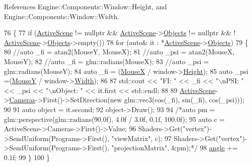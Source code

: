 References Engine\+::\+Components\+::\+Window\+::\+Height, and Engine\+::\+Components\+::\+Window\+::\+Width.


\begin{DoxyCode}
76 \{
77     \textcolor{keywordflow}{if} (\mbox{\hyperlink{classEngine_1_1BaseEngine_adb3dbc839da9d821e08b18d8a221698d}{ActiveScene}} != \textcolor{keyword}{nullptr} && \mbox{\hyperlink{classEngine_1_1BaseEngine_adb3dbc839da9d821e08b18d8a221698d}{ActiveScene}}->\mbox{\hyperlink{classEngine_1_1Components_1_1Scene_a23481feabaaa56bf5613765db03af4da}{Objects}} != \textcolor{keyword}{nullptr} && !
      \mbox{\hyperlink{classEngine_1_1BaseEngine_adb3dbc839da9d821e08b18d8a221698d}{ActiveScene}}->\mbox{\hyperlink{classEngine_1_1Components_1_1Scene_a23481feabaaa56bf5613765db03af4da}{Objects}}->empty())
78         \textcolor{keywordflow}{for} (\textcolor{keyword}{auto}& it : *\mbox{\hyperlink{classEngine_1_1BaseEngine_adb3dbc839da9d821e08b18d8a221698d}{ActiveScene}}->\mbox{\hyperlink{classEngine_1_1Components_1_1Scene_a23481feabaaa56bf5613765db03af4da}{Objects}})
79         \{
80             \textcolor{comment}{//auto \_fi = atan2(MouseY, MouseX);}
81             \textcolor{comment}{//auto \_psi = atan2(MouseX, MouseY);}
82             \textcolor{comment}{//auto \_fi = glm::radians(MouseX);}
83             \textcolor{comment}{//auto \_psi = glm::radians(MouseY);}
84             \textcolor{keyword}{auto} \_fi = (\mbox{\hyperlink{classEngine_1_1BaseEngine_a5fe085152ebe93346900407f6b41a034}{MouseX}} / window->\mbox{\hyperlink{classEngine_1_1Components_1_1Window_ad9cf40200634bff27dbc7ae9a841bb99}{Height}});
85             \textcolor{keyword}{auto} \_psi =(\mbox{\hyperlink{classEngine_1_1BaseEngine_a143c9c32dbbdc70bf1546ffe275bf384}{MouseY}} / window->\mbox{\hyperlink{classEngine_1_1Components_1_1Window_ad5f71bfbb06ff5452b63bddf4b0c20b1}{Width}});
86 
87             std::cout << \textcolor{stringliteral}{"FI:  "} << \_fi << \textcolor{stringliteral}{"\(\backslash\)nPSI: "} << \_psi << \textcolor{stringliteral}{"\(\backslash\)nObject: "} << it.first << std::endl;
88 
89             \mbox{\hyperlink{classEngine_1_1BaseEngine_adb3dbc839da9d821e08b18d8a221698d}{ActiveScene}}->\mbox{\hyperlink{classEngine_1_1Components_1_1Scene_aea98ff1ced88ee859878b504e9a2a362}{Cameras}}->First()->SetDirection(\textcolor{keyword}{new} glm::vec3(cos(\_fi), sin(\_fi),
       cos(\_psi)));
90 
91             \textcolor{keyword}{auto} \textcolor{keywordtype}{object} = it.second;
92             \textcolor{keywordtype}{object}->Draw();
93 
94             \textcolor{comment}{/*auto pm = glm::perspective(glm::radians(90.0f), 4.0f / 3.0f, 0.1f, 100.0f);}
95 \textcolor{comment}{            auto c = ActiveScene->Cameras->First()->Value;}
96 \textcolor{comment}{            Shaders->Get("vertex")->SendUniform(Programs->First(), "viewMatrix", c);}
97 \textcolor{comment}{            Shaders->Get("vertex")->SendUniform(Programs->First(), "projectionMatrix", &pm);*/}
98             \mbox{\hyperlink{classApplication_1_1Engines_1_1CameraEngine_a5298e9f5fa1a2984e21274c4524f771c}{angle}} += 0.1f;
99         \}
100 \}
\end{DoxyCode}
